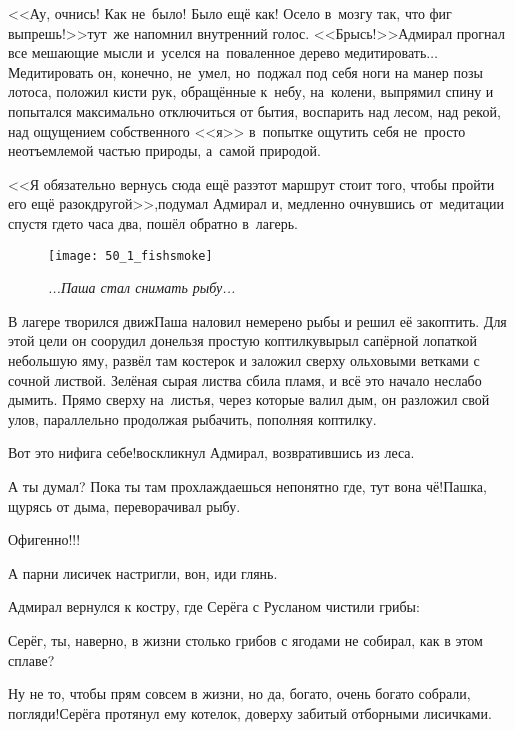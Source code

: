 <<Ау, очнись! Как не~было! Было ещё как! Осело в~мозгу так, что фиг выпрешь!>>\mdash тут~же напомнил внутренний голос. <<Брысь!>>\mdash Адмирал прогнал все мешающие мысли и~уселся на~поваленное дерево медитировать$\ldots$ Медитировать он, конечно, не~умел, но~поджал под себя ноги на манер позы лотоса, положил кисти рук, обращённые к~небу, на~колени, выпрямил спину и попытался максимально отключиться от бытия, воспарить над лесом, над рекой, над ощущением собственного <<я>> в~попытке ощутить себя не~просто неотъемлемой частью природы, а~самой природой.

<<Я обязательно вернусь сюда ещё раз\mdash этот маршрут стоит того, чтобы пройти его ещё разок\sdash другой>>,\mdash подумал Адмирал и, медленно очнувшись от~медитации спустя где\sdash то часа два, пошёл обратно в~лагерь.


\newpage

\begin{wrapfigure}[22]{l}{0.58\textwidth}
	\centering
	\texttt{[image: 50\_1\_fishsmoke]}
	\caption{\small\textit{...Паша стал снимать рыбу...}}
\end{wrapfigure}
В лагере творился движ\mdash Паша наловил немерено рыбы и решил её закоптить. Для этой цели он соорудил донельзя простую коптилку\mdash вырыл сапёрной лопаткой небольшую яму, развёл там костерок и заложил сверху ольховыми ветками с сочной листвой. Зелёная сырая листва сбила пламя, и всё это начало неслабо дымить. Прямо сверху на~листья, через которые валил дым, он разложил свой улов, параллельно продолжая рыбачить, пополняя коптилку.

\diagdash Вот это нифига себе!\mdash воскликнул Адмирал, возвратившись из леса.

\diagdash А ты думал? Пока ты там прохлаждаешься непонятно где, тут вона чё!\mdash Пашка, щурясь от дыма, переворачивал рыбу.

\diagdash Офигенно!!!

\diagdash А парни лисичек настригли, вон, иди глянь.

Адмирал вернулся к костру, где Серёга с Русланом чистили грибы:

\diagdash Серёг, ты, наверно, в жизни столько грибов с ягодами не собирал, как в этом сплаве?

\diagdash Ну не то, чтобы прям совсем в жизни, но да, богато, очень богато собрали, погляди!\mdash Серёга протянул ему котелок, доверху забитый отборными лисичками.

